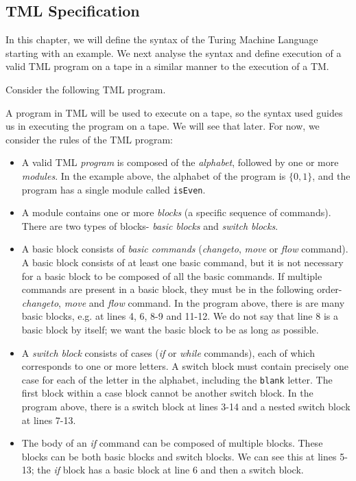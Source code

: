 \begin{appendices}
\chapter{TML Specification}

In this chapter, we will define the syntax of the Turing Machine Language starting with an example. We next analyse the syntax and define execution of a valid TML program on a tape in a similar manner to the execution of a TM.

Consider the following TML program.

A program in TML will be used to execute on a tape, so the syntax used guides us in executing the program on a tape. We will see that later. For now, we consider the rules of the TML program:
\begin{itemize}
    \item A valid TML \emph{program} is composed of the \emph{alphabet}, followed by one or more \emph{modules}. In the example above, the alphabet of the program is $\{0, 1\}$, and the program has a single module called \texttt{isEven}.
    \item A module contains one or more \emph{blocks} (a specific sequence of commands). There are two types of blocks- \emph{basic blocks} and \emph{switch blocks}.
    \item A basic block consists of \emph{basic commands} (\textit{changeto}, \textit{move} or \textit{flow} command). A basic block consists of at least one basic command, but it is not necessary for a basic block to be composed of all the basic commands. If multiple commands are present in a basic block, they must be in the following order- \textit{changeto}, \textit{move} and \textit{flow} command. In the program above, there is are many basic blocks, e.g. at lines 4, 6, 8-9 and 11-12. We do not say that line 8 is a basic block by itself; we want the basic block to be as long as possible.
    \item A \emph{switch block} consists of cases (\textit{if} or \textit{while} commands), each of which corresponds to one or more letters. A switch block must contain precisely one case for each of the letter in the alphabet, including the \texttt{blank} letter. The first block within a case block cannot be another switch block. In the program above, there is a switch block at lines 3-14 and a nested switch block at lines 7-13.
    \item The body of an \textit{if} command can be composed of multiple blocks. These blocks can be both basic blocks and switch blocks. We can see this at lines 5-13; the \textit{if} block has a basic block at line 6 and then a switch block.

\end{itemize}
\end{appendices}
